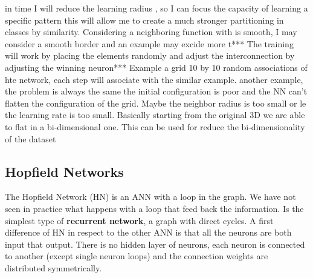 \documentclass{article}
\begin{document}
in time I will reduce the learning radius , so I can focus the capacity of learning a specific pattern
this will allow me to create a much stronger partitioning in classes by similarity.
Considering a neighboring function with is smooth, I may consider a smooth border and an example may excide more t***
\newline\newline
The training will work by placing the elements randomly and adjust the interconnection by adjusting the winning neuron***
\newline\newline
Example a grid 10 by 10
random associations of hte network, each step will associate with the similar example.
another example,
the problem is always the same the initial configuration is poor and the NN can't flatten the configuration
of the grid. Maybe the neighbor radius is too small or le the learning rate is too small.
\newline\newline
Basically starting from the original 3D we are able to flat in a bi-dimensional one. This can be used for reduce the
bi-dimensionality of the dataset

\subsection{Hopfield Networks}
The Hopfield Network (HN) is an ANN with a loop in the graph. We have not seen in practice
what happens with a loop that feed back the information. Is the simplest type of
\textbf{recurrent network}, a graph with direct cycles. A first difference of HN in respect to the other ANN is
that all the neurons are both input that output. There is no hidden layer of neurons, each neuron is connected
to another (except single neuron loops) and the connection weights are distributed symmetrically.
\end{document}
